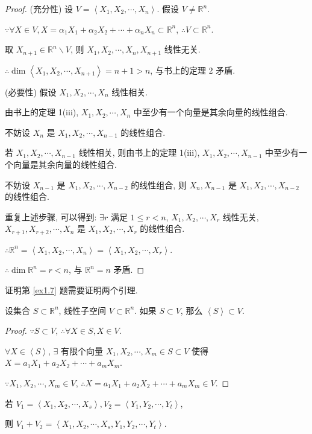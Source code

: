 \documentclass{ctexart}
\begin{document}
\begin{proof}
    (充分性) 设 $V=\left<X_1,X_2,\cdots,X_n\right>$. 假设 $V\neq\mathbb{R}^n$.

    $\because\forall X\in V,X=\alpha_1X_1+\alpha_2X_2+\cdots+\alpha_nX_n\subset\mathbb{R}^n$, $\therefore V\subset\mathbb{R}^n$.

    取 $X_{n+1}\in\mathbb{R}^n\backslash V$, 则 $X_1,X_2,\cdots,X_n,X_{n+1}$ 线性无关.

    $\therefore\dim\left<X_1,X_2,\cdots,X_{n+1}\right>=n+1>n$, 与书上的定理 2 矛盾.

    (必要性) 假设 $X_1,X_2,\cdots,X_n$ 线性相关.

    由书上的定理 1(iii), $X_1,X_2,\cdots,X_n$ 中至少有一个向量是其余向量的线性组合.
    
    不妨设 $X_n$ 是 $X_1,X_2,\cdots,X_{n-1}$ 的线性组合.

    若 $X_1,X_2,\cdots,X_{n-1}$ 线性相关, 则由书上的定理 1(iii), $X_1,X_2,\cdots,X_{n-1}$ 中至少有一个向量是其余向量的线性组合.

    不妨设 $X_{n-1}$ 是 $X_1,X_2,\cdots,X_{n-2}$ 的线性组合, 则 $X_n,X_{n-1}$ 是 $X_1,X_2,\cdots,X_{n-2}$ 的线性组合.

    重复上述步骤, 可以得到: $\exists r$ 满足 $1\leq r<n$, $X_1,X_2,\cdots,X_r$ 线性无关, $X_{r+1},X_{r+2},\cdots,X_n$ 是 $X_1,X_2,\cdots,X_r$ 的线性组合.

    $\therefore\mathbb{R}^n=\left<X_1,X_2,\cdots,X_n\right>=\left<X_1,X_2,\cdots,X_r\right>$.

    $\therefore\dim\mathbb{R}^n=r<n$, 与 $\mathbb{R}^n=n$ 矛盾.
\end{proof}
证明第 \ref{ex1.7} 题需要证明两个引理.
\begin{lemma}\label{l2.1}
    设集合 $S\subset\mathbb{R}^n$, 线性子空间 $V\subset\mathbb{R}^n$. 如果 $S\subset V$, 那么 $\left<S\right>\subset V$.
\end{lemma}
\begin{proof}
    $\because S\subset V$, $\therefore\forall X\in S,X\in V$.

    $\forall X\in\left<S\right>$, $\exists$ 有限个向量 $X_1,X_2,\cdots,X_m\in S\subset V$ 使得 $X=a_1X_1+a_2X_2+\cdots+a_mX_m$.

    $\because X_1,X_2,\cdots,X_m\in V$, $\therefore X=a_1X_1+a_2X_2+\cdots+a_mX_m\in V$.
\end{proof}
\begin{lemma}\label{l2.2}
    若 $V_1=\left<X_1,X_2,\cdots,X_s\right>,V_2=\left<Y_1,Y_2,\cdots,Y_t\right>$,
    
    则 $V_1+V_2=\left<X_1,X_2,\cdots,X_s,Y_1,Y_2,\cdots,Y_t\right>$.
\end{lemma}
\end{document}

